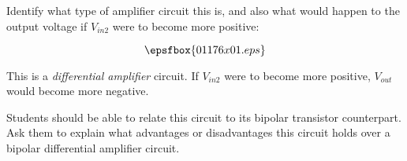 

Identify what type of amplifier circuit this is, and also what would happen to the output voltage if $V_{in2}$ were to become more positive:

$$\epsfbox{01176x01.eps}$$







This is a {\it differential amplifier} circuit.  If $V_{in2}$ were to become more positive, $V_{out}$ would become more negative.







Students should be able to relate this circuit to its bipolar transistor counterpart.  Ask them to explain what advantages or disadvantages this circuit holds over a bipolar differential amplifier circuit.



